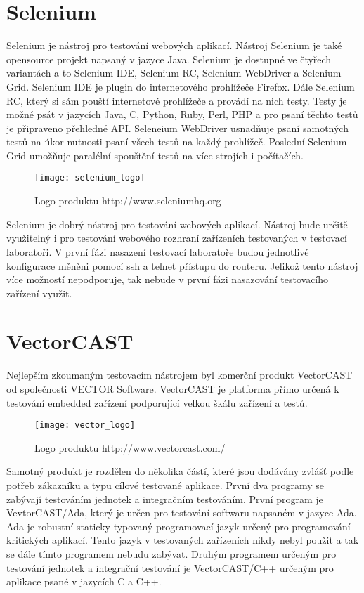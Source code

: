 \section{Selenium}
Selenium je nástroj pro testování webových aplikací. Nástroj Selenium je také opensource projekt napsaný v jazyce Java. Selenium je dostupné ve čtyřech variantách a to Selenium IDE, Selenium RC, Selenium WebDriver a Selenium Grid. Selenium IDE je plugin do internetového prohlížeče Firefox. Dále Selenium RC, který si sám pouští internetové prohlížeče a provádí na nich testy. Testy je možné psát v jazycích Java, C, Python, Ruby, Perl, PHP a pro psaní těchto testů je připraveno přehledné API. Seleneium WebDriver usnadňuje psaní samotných testů na úkor nutnosti psaní všech testů na každý prohlížeč. Poslední Selenium Grid umožňuje paralélní spouštění testů na více strojích i počítačích.

\begin{figure}[h]
  \centering
  \texttt{[image: selenium\_logo]}
  \caption{Logo produktu http://www.seleniumhq.org}
  \label{fig:selenium_logo}
\end{figure}

Selenium je dobrý nástroj pro testování webových aplikací. Nástroj bude určitě využitelný i pro testování webového rozhraní zařízeních testovaných v testovací laboratoři. V první fázi nasazení testovací laboratoře budou jednotlivé konfigurace měněni pomocí ssh a telnet přístupu do routeru. Jelikož tento nástroj více možností nepodporuje, tak nebude v první fázi nasazování testovacího zařízení využit.

\section{VectorCAST}
Nejlepším zkoumaným testovacím nástrojem byl komerční produkt VectorCAST od společnosti VECTOR Software. VectorCAST je platforma přímo určená k testování embedded zařízení podporující velkou škálu zařízení a testů.

\begin{figure}[h]
  \centering
  \texttt{[image: vector\_logo]}
  \caption{Logo produktu http://www.vectorcast.com/}
  \label{fig:vector_logo}
\end{figure}

Samotný produkt je rozdělen do několika částí, které jsou dodávány zvlášť podle potřeb zákazníku a typu cílové testované aplikace. První dva programy se zabývají testováním jednotek a integračním testováním. První program je VevtorCAST/Ada, který je určen pro testování softwaru napsaném v jazyce Ada. Ada je robustní staticky typovaný programovací jazyk určený pro programování kritických aplikací. Tento jazyk v testovaných zařízeních nikdy nebyl použit a tak se dále tímto programem nebudu zabývat. Druhým programem určeným pro testování jednotek a integrační testování je VectorCAST/C++ určeným pro aplikace psané v jazycích C a C++.

